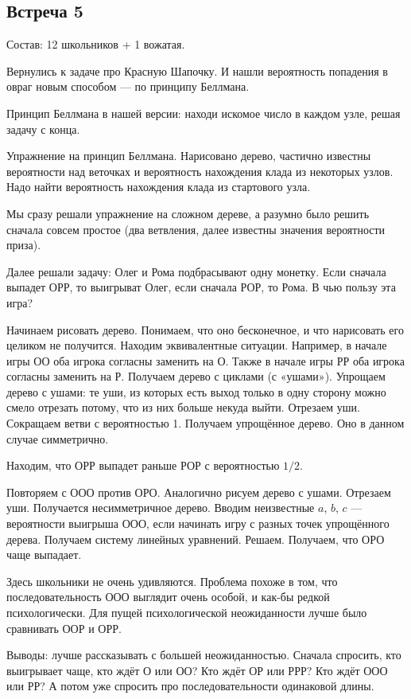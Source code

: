 \documentclass[a4paper, 12pt]{article}
\begin{document}
\begin{enumerate}
\section{Встреча 5}

Состав: 12 школьников + 1 вожатая.

Вернулись к задаче про Красную Шапочку. И нашли вероятность попадения в овраг новым способом — по принципу Беллмана.

Принцип Беллмана в нашей версии: находи искомое число в каждом узле, решая задачу с конца.

Упражнение на принцип Беллмана. Нарисовано дерево, частично известны вероятности над веточках и вероятность нахождения клада из некоторых узлов. Надо найти вероятность нахождения клада из стартового узла.

Мы сразу решали упражнение на сложном дереве, а разумно было решить сначала совсем простое (два ветвления, далее известны значения вероятности приза).

Далее решали задачу: Олег и Рома подбрасывают одну монетку. Если сначала выпадет ОРР, то выигрыват Олег, если сначала РОР, то Рома. В чью пользу эта игра?

Начинаем рисовать дерево. Понимаем, что оно бесконечное, и что нарисовать его целиком не получится. Находим эквивалентные ситуации. Например, в начале игры ОО оба игрока согласны заменить на О. Также в начале игры РР оба игрока согласны заменить на Р. Получаем дерево с циклами (с «ушами»). Упрощаем дерево с ушами: те уши, из которых есть выход только в одну сторону можно смело отрезать потому, что из них больше некуда выйти. Отрезаем уши. Сокращаем ветви с вероятностью 1. Получаем упрощённое дерево. Оно в данном случае симметрично.

Находим, что  ОРР выпадет раньше РОР с вероятностью $1/2$.

Повторяем с ООО против ОРО. Аналогично рисуем дерево с ушами. Отрезаем уши. Получается несимметричное дерево. Вводим неизвестные $a$, $b$, $c$ — вероятности выигрыша ООО, если начинать игру с разных точек упрощённого дерева. Получаем систему линейных уравнений. Решаем. Получаем, что ОРО чаще выпадает.

Здесь школьники не очень удивляются. Проблема похоже в том, что последовательность ООО выглядит очень особой, и как-бы редкой психологически. Для пущей психологической неожиданности лучше было сравнивать ООР и ОРР.

Выводы: лучше рассказывать с большей неожиданностью. Сначала спросить, кто выигрывает чаще, кто ждёт О или ОО? Кто ждёт ОР или РРР?
Кто ждёт ООО или РР? А потом уже спросить про последовательности одинаковой длины.


\end{enumerate}
\end{document}
